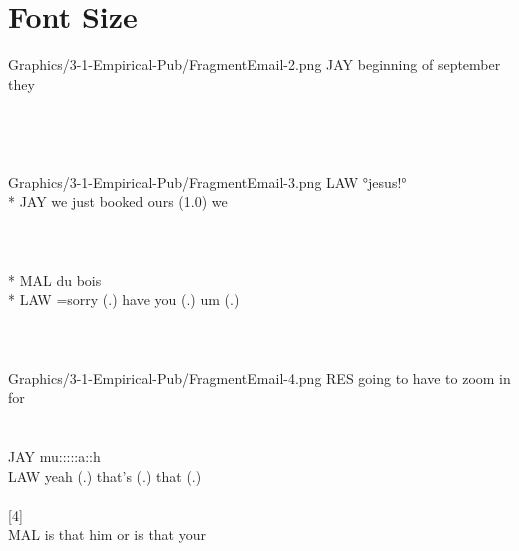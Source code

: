 \section{Font Size}\label{app:fragments-pub fontsize}
\begin{inlinefrag*} 
    \begin{transcript*}
           {Graphics/3-1-Empirical-Pub/FragmentEmail-2.png}
        \by JAY {beginning of september they} \\
         \\
         \\
         \\
         \\
           {Graphics/3-1-Empirical-Pub/FragmentEmail-3.png}
        \by LAW {°jesus!°} \\*
        \by JAY {we just booked ours (1.0) we} \\
         \\
         \\
         \\*
        \by MAL {du bois\intUp} \\*
        \by LAW {=sorry (.) have you (.) um (.)} \\
         \\
         \\
         \\
           {Graphics/3-1-Empirical-Pub/FragmentEmail-4.png}
        \by RES {going to have to zoom in for} \\
         \\
         \\
        \by JAY {mu:::::a::h} \\
        \by LAW {yeah (.) that's (.) that (.)} \\
         \\
        \later  {\ldots}[4] \\
        \by MAL {is that him or is that your} \\
         \\
    \end{transcript*}
\end{inlinefrag*}

